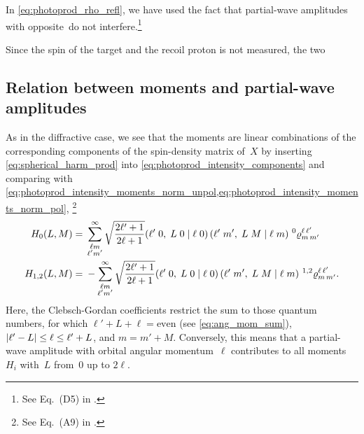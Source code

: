 In \cref{eq:photoprod_rho_refl}, we have used the fact that
partial-wave amplitudes with opposite~ do not
interfere.\footnote{See Eq.~(D5) in .}



Since the spin of the target and the
recoil proton is not measured, the two





\subsection{Relation between moments and partial-wave amplitudes}%
\label{sec:photoprod:moments_pw}

As in the diffractive case, we see that the moments are linear
combinations of the corresponding components of the spin-density
matrix of~$X$ by inserting \cref{eq:spherical_harm_prod} into
\cref{eq:photoprod_intensity_components} and comparing with
\cref{eq:photoprod_intensity_moments_norm_unpol,eq:photoprod_intensity_moments_norm_pol},
\ie\footnote{See Eq.~(A9) in .}
\begin{align}
  H_0(L, M)
  ={}& \sum_{\substack{\ell m \\ \ell' m'}}^\infty \sqrt{\frac{2 \ell' + 1}{2 \ell + 1}}
  ({\ell'}\;{0},\;{L}\;{0}\; |\; {\ell}\;{0})\, ({\ell'}\;{m'},\;{L}\;{M}\; |\; {\ell}\;{m})\,
  \prescript{0}{}{\varrho}^{\ell\, \ell'}_{m\, m'}
  \\
  H_{1, 2}(L, M)
  ={}& -\sum_{\substack{\ell m \\ \ell' m'}}^\infty \sqrt{\frac{2 \ell' + 1}{2 \ell + 1}}
  ({\ell'}\;{0},\;{L}\;{0}\; |\; {\ell}\;{0})\, ({\ell'}\;{m'},\;{L}\;{M}\; |\; {\ell}\;{m})\,
  \prescript{1, 2}{}{\varrho}^{\ell\, \ell'}_{m\, m'}.
\end{align}
Here, the Clebsch-Gordan coefficients restrict the sum to those
quantum numbers, for which $\ell' + L + \ell = \text{even}$ (see
\cref{eq:ang_mom_sum}), $\vert{\ell' - L}\vert \leq \ell \leq \ell' + L$,
and $m = m' + M$.  Conversely, this means that a partial-wave
amplitude with orbital angular momentum~$\ell$ contributes to all
moments~$H_i$ with~$L$ from~0 up to $2 \ell$.
